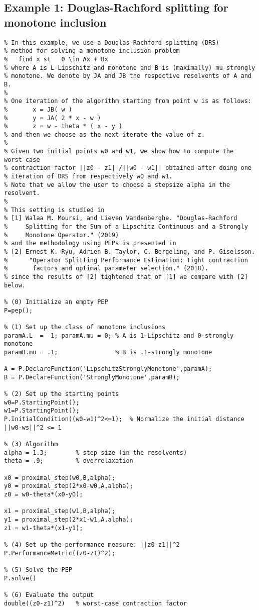 \documentclass[11pt,a4paper]{article}
\begin{document}
					\subsection{Example 1: Douglas-Rachford splitting for monotone inclusion}
		\begin{lstlisting}
% In this example, we use a Douglas-Rachford splitting (DRS)
% method for solving a monotone inclusion problem
%   find x st   0 \in Ax + Bx
% where A is L-Lipschitz and monotone and B is (maximally) mu-strongly
% monotone. We denote by JA and JB the respective resolvents of A and B.
%
% One iteration of the algorithm starting from point w is as follows:
%       x = JB( w )
%       y = JA( 2 * x - w )
%       z = w - theta * ( x - y )
% and then we choose as the next iterate the value of z.
%
% Given two initial points w0 and w1, we show how to compute the worst-case
% contraction factor ||z0 - z1||/||w0 - w1|| obtained after doing one
% iteration of DRS from respectively w0 and w1.
% Note that we allow the user to choose a stepsize alpha in the resolvent.
%
% This setting is studied in
% [1] Walaa M. Moursi, and Lieven Vandenberghe. "Douglas-Rachford
%     Splitting for the Sum of a Lipschitz Continuous and a Strongly
%     Monotone Operator." (2019)
% and the methodology using PEPs is presented in
% [2] Ernest K. Ryu, Adrien B. Taylor, C. Bergeling, and P. Giselsson.
%      "Operator Splitting Performance Estimation: Tight contraction
%       factors and optimal parameter selection." (2018).
% since the results of [2] tightened that of [1] we compare with [2] below.

% (0) Initialize an empty PEP
P=pep();

% (1) Set up the class of monotone inclusions
paramA.L  =  1; paramA.mu = 0; % A is 1-Lipschitz and 0-strongly monotone
paramB.mu = .1;                % B is .1-strongly monotone

A = P.DeclareFunction('LipschitzStronglyMonotone',paramA);
B = P.DeclareFunction('StronglyMonotone',paramB);

% (2) Set up the starting points
w0=P.StartingPoint();
w1=P.StartingPoint();
P.InitialCondition((w0-w1)^2<=1);  % Normalize the initial distance ||w0-ws||^2 <= 1

% (3) Algorithm
alpha = 1.3;		% step size (in the resolvents)
theta = .9;         % overrelaxation

x0 = proximal_step(w0,B,alpha);
y0 = proximal_step(2*x0-w0,A,alpha);
z0 = w0-theta*(x0-y0);

x1 = proximal_step(w1,B,alpha);
y1 = proximal_step(2*x1-w1,A,alpha);
z1 = w1-theta*(x1-y1);

% (4) Set up the performance measure: ||z0-z1||^2
P.PerformanceMetric((z0-z1)^2);

% (5) Solve the PEP
P.solve()

% (6) Evaluate the output
double((z0-z1)^2)   % worst-case contraction factor
\end{lstlisting}
					\clearpage
\end{document}

